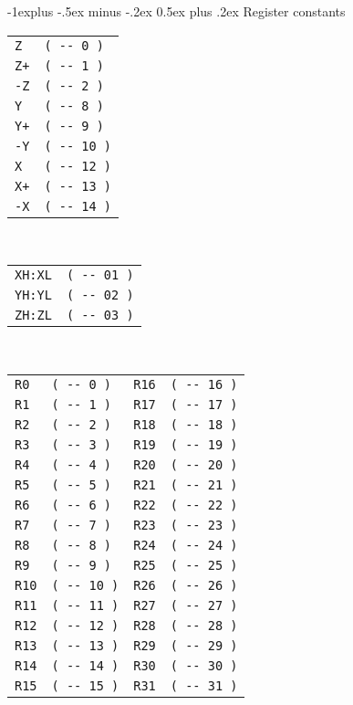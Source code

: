 \documentclass[10pt,landscape,a4paper]{article}
\makeatletter
\renewcommand{\subsection}{\@startsection{subsection}{2}{0mm}%
                                {-1explus -.5ex minus -.2ex}%
                                {0.5ex plus .2ex}%
                                {\normalfont\normalsize\bfseries}}
\makeatother
\begin{document}
\begin{multicols}{3}
\subsection{Register constants}
\begin{tabular}{@{}ll@{}}
\verb!Z!  & \verb!( -- 0 )! \\
\verb!Z+! & \verb!( -- 1 )! \\
\verb!-Z! & \verb!( -- 2 )! \\
\verb!Y!  & \verb!( -- 8 )! \\
\verb!Y+! & \verb!( -- 9 )! \\
\verb!-Y! & \verb!( -- 10 )! \\
\verb!X!  & \verb!( -- 12 )! \\
\verb!X+! & \verb!( -- 13 )! \\
\verb!-X! & \verb!( -- 14 )! \\
\end{tabular}\\
\begin{tabular}{@{}ll@{}}
\verb!XH:XL! & \verb!( -- 01 )! \\
\verb!YH:YL! & \verb!( -- 02 )! \\
\verb!ZH:ZL! & \verb!( -- 03 )! \\
\end{tabular}\\
\begin{tabular}{@{}ll|ll@{}}
\verb!R0! & \verb!( -- 0 )! & \verb!R16! & \verb!( -- 16 )! \\
\verb!R1! & \verb!( -- 1 )! & \verb!R17! & \verb!( -- 17 )! \\
\verb!R2! & \verb!( -- 2 )! & \verb!R18! & \verb!( -- 18 )! \\
\verb!R3! & \verb!( -- 3 )! & \verb!R19! & \verb!( -- 19 )! \\
\verb!R4! & \verb!( -- 4 )! & \verb!R20! & \verb!( -- 20 )! \\
\verb!R5! & \verb!( -- 5 )! & \verb!R21! & \verb!( -- 21 )! \\
\verb!R6! & \verb!( -- 6 )! & \verb!R22! & \verb!( -- 22 )! \\
\verb!R7! & \verb!( -- 7 )! & \verb!R23! & \verb!( -- 23 )! \\
\verb!R8! & \verb!( -- 8 )! & \verb!R24! & \verb!( -- 24 )! \\
\verb!R9! & \verb!( -- 9 )! & \verb!R25! & \verb!( -- 25 )! \\
\verb!R10! & \verb!( -- 10 )! & \verb!R26! & \verb!( -- 26 )! \\
\verb!R11! & \verb!( -- 11 )! & \verb!R27! & \verb!( -- 27 )! \\
\verb!R12! & \verb!( -- 12 )! & \verb!R28! & \verb!( -- 28 )! \\
\verb!R13! & \verb!( -- 13 )! & \verb!R29! & \verb!( -- 29 )! \\
\verb!R14! & \verb!( -- 14 )! & \verb!R30! & \verb!( -- 30 )! \\
\verb!R15! & \verb!( -- 15 )! & \verb!R31! & \verb!( -- 31 )! \\
\end{tabular}\\


\end{multicols}
\end{document}
